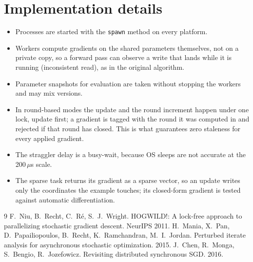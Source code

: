 \documentclass[11pt]{article}
\begin{document}
\section{Implementation details}  %
\begin{itemize}
\item Processes are started with the \texttt{spawn} method on every platform.
\item Workers compute gradients on the shared parameters themselves, not on a
  private copy, so a forward pass can observe a write that lands while it is
  running (inconsistent read), as in the original algorithm.
\item Parameter snapshots for evaluation are taken without stopping the
  workers and may mix versions.
\item In round-based modes the update and the round increment happen under
  one lock, update first; a gradient is tagged with the round it was computed
  in and rejected if that round has closed. This is what guarantees zero
  staleness for every applied gradient.
\item The straggler delay is a busy-wait, because OS sleeps are not accurate
  at the 200\,$\mu$s scale.
\item The sparse task returns its gradient as a sparse vector, so an update
  writes only the coordinates the example touches; its closed-form gradient
  is tested against automatic differentiation.
\end{itemize}

\begin{thebibliography}{9}
 F.~Niu, B.~Recht, C.~R\'e, S.~J.~Wright. HOGWILD!: A lock-free approach to parallelizing stochastic gradient descent. NeurIPS 2011.
 H.~Mania, X.~Pan, D.~Papailiopoulos, B.~Recht, K.~Ramchandran, M.~I.~Jordan. Perturbed iterate analysis for asynchronous stochastic optimization. 2015.
 J.~Chen, R.~Monga, S.~Bengio, R.~Jozefowicz. Revisiting distributed synchronous SGD. 2016.
\end{thebibliography}
\end{document}
